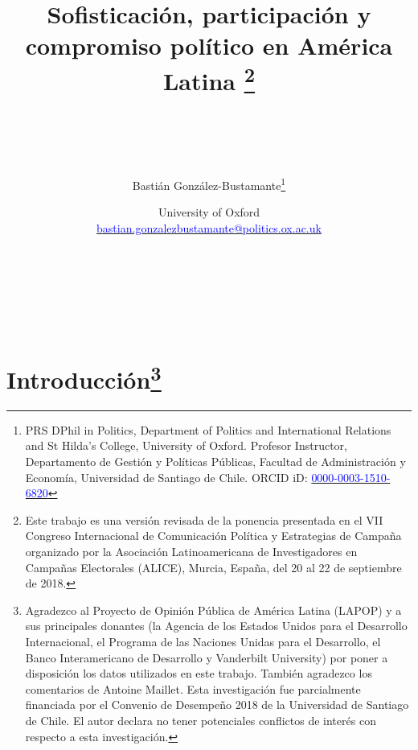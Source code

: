 \documentclass[a4paper]{tufte-handout}
\title{Sofisticación, participación y compromiso político en América Latina \thanks{Este trabajo es una versión revisada de la ponencia presentada en el VII Congreso Internacional de Comunicación Política y Estrategias de Campaña organizado por la Asociación Latinoamericana de Investigadores en Campañas Electorales (ALICE), Murcia, España, del 20 al 22 de septiembre de 2018.}
\\~\\~\\}
\author{{\normalfont Basti\'an Gonz\'alez-Bustamante}\thanks{PRS DPhil in Politics, Department of Politics and International Relations and St Hilda's College, University of Oxford. Profesor Instructor, Departamento de Gesti\'on y Pol\'iticas P\'ublicas, Facultad de Administraci\'on y Econom\'ia, Universidad de Santiago de Chile. ORCID iD: \href{https://orcid.org/0000-0003-1510-6820}{\textcolor{blue}{0000-0003-1510-6820}}}}
\date{{\normalfont \normalsize \vspace{-1mm}University of Oxford} \\ {\LARGE \Letter} \href{mailto:bastian.gonzalezbustamante@politics.ox.ac.uk}{\textcolor{blue}{\normalfont \normalsize bastian.gonzalezbustamante@politics.ox.ac.uk}}
}
\begin{document}
\maketitle

\vspace{8mm}
\\~\\

{\noindent \LARGE \itshape }\\





\vspace{8mm}
\section[Introducci\'on] {{\normalfont Introducci\'on}\footnote{Agradezco al Proyecto de Opinión Pública de América Latina (LAPOP) y a sus principales donantes (la Agencia de los Estados Unidos para el Desarrollo Internacional, el Programa de las Naciones Unidas para el Desarrollo, el Banco Interamericano de Desarrollo y Vanderbilt University) por poner a disposición los datos utilizados en este trabajo. También agradezco los comentarios de Antoine Maillet. Esta investigación fue parcialmente financiada por el Convenio de Desempeño 2018 de la Universidad de Santiago de Chile. El autor declara no tener potenciales conflictos de interés con respecto a esta investigación.}}


\end{document}
